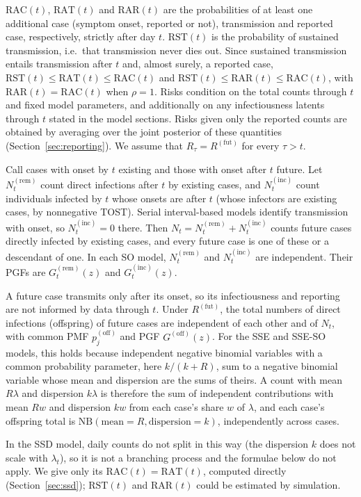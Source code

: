 \documentclass{article}
\newcommand{\NBDist}[2]{\mathrm{NB}\left(\mathrm{mean}=#1,
\mathrm{dispersion}=#2\right)}
\newcommand{\offPMF}{p^{(\mathrm{off})}}
\newcommand{\offPGF}{G^{(\mathrm{off})}}
\newcommand{\Rfut}{R^{(\mathrm{fut})}}
\newcommand{\RAC}{\mathrm{RAC}}
\newcommand{\RAT}{\mathrm{RAT}}
\newcommand{\RST}{\mathrm{RST}}
\newcommand{\RAR}{\mathrm{RAR}}
\begin{document}
\(\RAC(t)\), \(\RAT(t)\) and \(\RAR(t)\) are the probabilities of at least
one additional case (symptom onset, reported or not), transmission and
reported case, respectively, strictly after day \(t\). \(\RST(t)\) is the
probability of sustained transmission, i.e.\ that transmission never dies
out. Since sustained transmission entails transmission after \(t\) and,
almost surely, a reported case, \(\RST(t)\leq\RAT(t)\leq\RAC(t)\) and
\(\RST(t)\leq\RAR(t)\leq\RAC(t)\), with \(\RAR(t)=\RAC(t)\) when
\(\rho=1\). Risks condition on the total counts through \(t\) and fixed
model parameters, and additionally on any infectiousness latents through
\(t\) stated in the model sections. Risks given only the reported counts
are obtained by averaging over the joint posterior of these quantities
(Section~\ref{sec:reporting}). We assume that \(R_\tau=\Rfut\) for every
\(\tau>t\).

Call cases with onset by \(t\) existing and those with onset after \(t\)
future. Let \(N_t^{(\mathrm{rem})}\) count direct infections after \(t\)
by existing cases, and \(N_t^{(\mathrm{inc})}\) count individuals infected
by \(t\) whose onsets are after \(t\) (whose infectors are existing cases,
by nonnegative TOST). Serial interval-based models identify transmission
with onset, so \(N_t^{(\mathrm{inc})}=0\) there. Then
\(N_t=N_t^{(\mathrm{rem})}+N_t^{(\mathrm{inc})}\) counts future cases
directly infected by existing cases, and every future case is one of these
or a descendant of one. In each SO model, \(N_t^{(\mathrm{rem})}\) and
\(N_t^{(\mathrm{inc})}\) are independent. Their PGFs are
\(G_t^{(\mathrm{rem})}(z)\) and \(G_t^{(\mathrm{inc})}(z)\).

A future case transmits only after its onset, so its infectiousness and
reporting are not informed by data through \(t\). Under \(\Rfut\), the
total numbers of direct infections (offspring) of future cases are
independent of each other and of \(N_t\), with common PMF \(\offPMF_j\)
and PGF \(\offPGF(z)\). For the SSE and SSE-SO models, this holds because
independent negative binomial variables with a common probability
parameter, here \(k/(k+R)\), sum to a negative binomial variable whose mean
and dispersion are the sums of theirs. A count with mean \(R\lambda\) and
dispersion \(k\lambda\) is therefore the sum of independent contributions
with mean \(Rw\) and dispersion \(kw\) from each case's share \(w\) of
\(\lambda\), and each case's offspring total is \(\NBDist{R}{k}\),
independently across cases.

In the SSD model, daily counts do not split in this way (the dispersion
\(k\) does not scale with \(\lambda_t\)), so it is not a branching process
and the formulae below do not apply. We give only its
\(\RAC(t)=\RAT(t)\), computed directly (Section~\ref{sec:ssd});
\(\RST(t)\) and \(\RAR(t)\) could be estimated by simulation.
\end{document}
